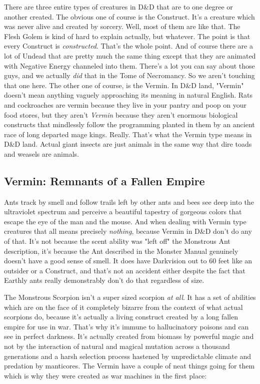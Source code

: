 There are three entire types of creatures in D\&D that are to one degree or another created. The obvious one of course is the Construct. It's a creature which was never alive and created by sorcery. Well, most of them are like that. The Flesh Golem is kind of hard to explain actually, but whatever. The point is that every Construct is \textit{constructed}. That's the whole point. And of course there are a lot of Undead that are pretty much the same thing except that they are animated with Negative Energy channeled into them. There's a lot you can say about those guys, and we actually \textit{did} that in the Tome of Necromancy. So we aren't touching that one here. The other one of course, is the Vermin. In D\&D land, "Vermin" doesn't mean anything vaguely approaching its meaning in natural English. Rats and cockroaches are vermin because they live in your pantry and poop on your food stores, but they aren't \textit{Vermin} because they aren't enormous biological constructs that mindlessly follow the programming planted in them by an ancient race of long departed mage kings. Really. That's what the Vermin type means in D\&D land. Actual giant insects are just animals in the same way that dire toads and weasels are animals.

\subsection{Vermin: Remnants of a Fallen Empire}
\vspace*{-8pt}

Ants track by smell and follow trails left by other ants and bees see deep into the ultraviolet spectrum and perceive a beautiful tapestry of gorgeous colors that escape the eye of the man and the mouse. And when dealing with Vermin type creatures that all means precisely \textit{nothing}, because Vermin in D\&D don't do any of that. It's not because the scent ability was "left off" the Monstrous Ant description, it's because the Ant described in the Monster Manual genuinely doesn't have a good sense of smell. It does have Darkvision out to 60 feet like an outsider or a Construct, and that's not an accident either despite the fact that Earthly ants really demonstrably don't do that regardless of size.

The Monstrous Scorpion isn't a super sized scorpion \textit{at all}. It has a set of abilities which are on the face of it completely bizarre from the context of what actual scorpions do, because it's actually a living construct created by a long fallen empire for use in war. That's why it's immune to hallucinatory poisons and can see in perfect darkness. It's actually created from biomass by powerful magic and not by the interaction of natural and magical mutation across a thousand generations and a harsh selection process hastened by unpredictable climate and predation by manticores. The Vermin have a couple of neat things going for them which is why they were created as war machines in the first place:

